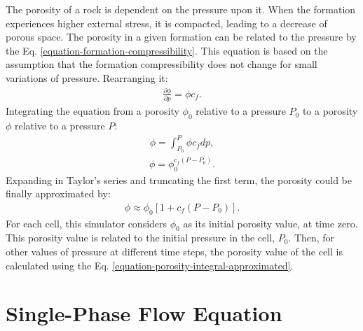 The porosity of a rock is dependent on the pressure upon it.
%
When the formation experiences higher external stress, it is compacted, leading to a decrease of porous space.
%
The porosity in a given formation can be related to the pressure by the Eq. \ref{equation-formation-compressibility}.
%
This equation is based on the assumption that the formation compressibility does not change for small variations of pressure.
%
Rearranging it:
%
\begin{align}
	\label{equation-porosity-derivative}
	\frac{\partial \phi}{\partial p} = \phi c_f.
\end{align}
%
Integrating the equation from a porosity $\phi_0$ relative to a pressure $P_0$ to a porosity $\phi$ relative to a pressure $P$:
%
%
\begin{align}
	\label{equation-porosity-integral}
	\phi= \int_{P_0}^{P}\phi c_f dp,
\end{align}
\begin{align}
	\label{equation-porosity-integral-solved}
	\phi= \phi_0^{c_f(P-P_0)}.
\end{align}
%
Expanding in Taylor's series and truncating the first term, the porosity could be finally approximated by:
%
\begin{align}
	\label{equation-porosity-integral-approximated}
	\phi\approx \phi_0[1+c_f(P-P_0)].
\end{align}
%
For each cell, this simulator considers $\phi_0$ as its initial porosity value, at time zero.
%
This porosity value is related to the initial pressure in the cell, $P_0$.
%
Then, for other values of pressure at different time steps, the porosity value of the cell is calculated using the Eq. \ref{equation-porosity-integral-approximated}.

\section{Single-Phase Flow Equation}

